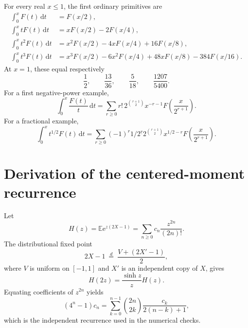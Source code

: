 \documentclass[11pt,oneside]{article}
\theoremstyle{definition}
\theoremstyle{remark}
\newcommand{\E}{\mathbb E}
\newcommand{\dd}{\,\mathrm d}
\newcommand{\e}{\mathrm e}
\newcommand{\fall}[2]{#1^{\underline{#2}}}
\newcommand{\1}{\mathbf 1}
\begin{document}
For every real \(x\leq1\), the first ordinary primitives are
\begin{align}
 \int_0^xF(t)\dd t
 &=F(x/2),                                                     \label{eq:sample-p0}\\
 \int_0^xtF(t)\dd t
 &=xF(x/2)-2F(x/4),                                           \label{eq:sample-p1}\\
 \int_0^xt^2F(t)\dd t
 &=x^2F(x/2)-4xF(x/4)+16F(x/8),                               \label{eq:sample-p2}\\
 \int_0^xt^3F(t)\dd t
 &=x^3F(x/2)-6x^2F(x/4)+48xF(x/8)-384F(x/16).                 \label{eq:sample-p3}
\end{align}
At \(x=1\), these equal respectively
\begin{equation}
 \frac12,\qquad \frac{13}{36},\qquad \frac5{18},\qquad
 \frac{1207}{5400}.                                           \label{eq:sample-definite}
\end{equation}
For a first negative-power example,
\begin{equation}
 \int_0^x\frac{F(t)}t\dd t
 =\sum_{r\geq0}r!\,2^{\binom{r+1}{2}}x^{-r-1}
 F\!\left(\frac{x}{2^{r+1}}\right).                            \label{eq:sample-negative-one}
\end{equation}
For a fractional example,
\begin{equation}
 \int_0^xt^{1/2}F(t)\dd t
 =\sum_{r\geq0}(-1)^r\fall{1/2}{r}
 2^{\binom{r+1}{2}}x^{1/2-r}
 F\!\left(\frac{x}{2^{r+1}}\right).                            \label{eq:sample-half}
\end{equation}

\section{Derivation of the centered-moment recurrence}

Let
\begin{equation}
 H(z)=\E\e^{z(2X-1)}=\sum_{n\geq0}c_n\frac{z^{2n}}{(2n)!}.      \label{eq:H-centered}
\end{equation}
The distributional fixed point
\begin{equation}
 2X-1\ \overset d=\ \frac{V+(2X'-1)}2,                         \label{eq:Y-fixed}
\end{equation}
where \(V\) is uniform on \([-1,1]\) and \(X'\) is an independent copy of
\(X\), gives
\begin{equation}
 H(2z)=\frac{\sinh z}{z}H(z).                                  \label{eq:H-functional}
\end{equation}
Equating coefficients of \(z^{2n}\) yields
\begin{equation}
 (4^n-1)c_n
 =\sum_{k=0}^{n-1}\binom{2n}{2k}\frac{c_k}{2(n-k)+1},          \label{eq:c-recurrence}
\end{equation}
which is the independent recurrence used in the numerical checks.
\end{document}
